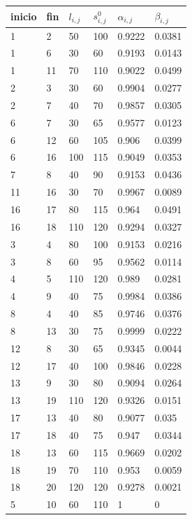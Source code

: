 \begin{table}[H]
\centering
\begin{tabular}{|l|l|l|l|l|l|}
\hline
inicio & fin & $l_{i,j}$ & $s_{i,j}^0$ & $\alpha_{i,j}$ & $\beta_{i,j}$ \\ \hline
1 & 2 & 50 & 100 & 0.9222 & 0.0381 \\ \hline
1 & 6 & 30 & 60 & 0.9193 & 0.0143 \\ \hline
1 & 11 & 70 & 110 & 0.9022 & 0.0499 \\ \hline
2 & 3 & 30 & 60 & 0.9904 & 0.0277 \\ \hline
2 & 7 & 40 & 70 & 0.9857 & 0.0305 \\ \hline
6 & 7 & 30 & 65 & 0.9577 & 0.0123 \\ \hline
6 & 12 & 60 & 105 & 0.906 & 0.0399 \\ \hline
6 & 16 & 100 & 115 & 0.9049 & 0.0353 \\ \hline
7 & 8 & 40 & 90 & 0.9153 & 0.0436 \\ \hline
11 & 16 & 30 & 70 & 0.9967 & 0.0089 \\ \hline
16 & 17 & 80 & 115 & 0.964 & 0.0491 \\ \hline
16 & 18 & 110 & 120 & 0.9294 & 0.0327 \\ \hline
3 & 4 & 80 & 100 & 0.9153 & 0.0216 \\ \hline
3 & 8 & 60 & 95 & 0.9562 & 0.0114 \\ \hline
4 & 5 & 110 & 120 & 0.989 & 0.0281 \\ \hline
4 & 9 & 40 & 75 & 0.9984 & 0.0386 \\ \hline
8 & 4 & 40 & 85 & 0.9746 & 0.0376 \\ \hline
8 & 13 & 30 & 75 & 0.9999 & 0.0222 \\ \hline
12 & 8 & 30 & 65 & 0.9345 & 0.0044 \\ \hline
12 & 17 & 40 & 100 & 0.9846 & 0.0228 \\ \hline
13 & 9 & 30 & 80 & 0.9094 & 0.0264 \\ \hline
13 & 19 & 110 & 120 & 0.9326 & 0.0151 \\ \hline
17 & 13 & 40 & 80 & 0.9077 & 0.035 \\ \hline
17 & 18 & 40 & 75 & 0.947 & 0.0344 \\ \hline
18 & 13 & 60 & 115 & 0.9669 & 0.0202 \\ \hline
18 & 19 & 70 & 110 & 0.953 & 0.0059 \\ \hline
18 & 20 & 120 & 120 & 0.9278 & 0.0021 \\ \hline
5 & 10 & 60 & 110 & 1 & 0 \\ \hline

\end{tabular}
\end{table}
